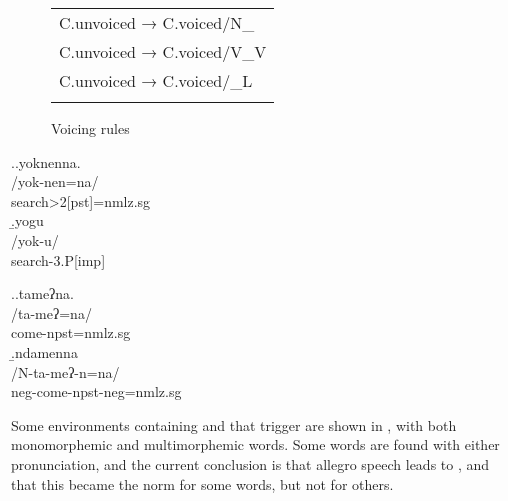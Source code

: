 \begin{figure}[htp]	
\begin{center}		
\begin{tabular}{l}
\lsptoprule
C.{\sc unvoiced} → C.{\sc voiced}/N\_\\
C.{\sc unvoiced} → C.{\sc voiced}/V\_V\\ 
C.{\sc unvoiced} → C.{\sc voiced}/\_L\\
\lspbottomrule
\end{tabular}
\caption{Voicing rules}\label{voic-fig}
\end{center}
\end{figure}


\ex.\a.\glll  yoknenna.\\
/yok-nen=na/\\
search{>2[pst]=nmlz.sg}\\
\b.\glll  yogu\\
/yok-u/\\
search{\sc -3.P[imp]}\\

\ex.\a.\glll  tameʔna.\\
/ta-meʔ=na/\\
come{\sc [3sg]-npst=nmlz.sg}\\
\b.\glll  ndamenna\\
/N-ta-meʔ-n=na/\\
{\sc neg-}come{\sc [3sg]-npst-neg=nmlz.sg}\\


Some environments containing  and  that trigger  are shown in , with both monomorphemic and multimorphemic words. Some words are found with either pronunciation, and the current conclusion is that allegro speech leads to , and that this became the norm for some words, but not for others. 





